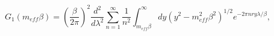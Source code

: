 \begin{equation}
G_{1}\left(m_{eff}\beta \right)=\left(\frac{\beta }{2\pi }\right)^{2}\frac{d^{2}}{d\lambda ^{2}}\sum _{n=1}^{\infty }\frac{1}{n^{2}}\int _{m_{eff}\beta }^{\infty }dy\left(y^{2}-m_{eff}^{2}\beta ^{2}\right)^{1/2}e^{-2\pi nry\lambda /\beta },\end{equation}

